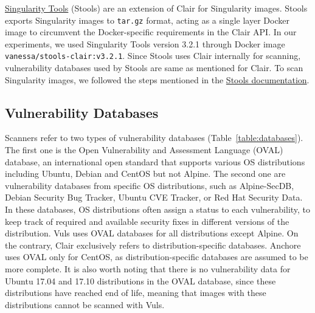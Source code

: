 \documentclass[a4paper,num-refs]{oup-contemporary}
\newcommand{\change}[2]{\color{cyan}Changes: #1\color{black}}
\newcommand{\tristan}[1]{\color{red}From Tristan: #1\color{black}}
\begin{document}
\href{https://github.com/singularityhub/stools}{Singularity Tools} (Stools)
are an extension of Clair for Singularity images. Stools
exports Singularity images to \texttt{tar.gz} format, acting as a single layer Docker image
to circumvent the Docker-specific requirements in the Clair API.
In our experiments, we used Singularity Tools version 3.2.1 through Docker
image
\texttt{vanessa/stools-clair:v3.2.1}.
Since Stools uses Clair internally for scanning, vulnerability databases used
by Stools are same as mentioned for Clair.
To scan Singularity images, we followed the steps mentioned in the
\href{https://github.com/singularityhub/stools}{Stools documentation}.

\subsection{Vulnerability Databases}

Scanners refer to two types of
vulnerability databases (Table~\ref{table:databases}). The first one is the Open Vulnerability and
Assessment Language (OVAL) database, an international open standard that
supports various OS distributions including Ubuntu, Debian and CentOS but
not Alpine. The second one are vulnerability databases from specific OS
distributions, such as Alpine-SecDB, Debian Security Bug Tracker, Ubuntu
CVE Tracker, or Red Hat Security Data. In these databases, OS distributions often assign a
status to each vulnerability, to keep track of required and available
security fixes in different versions of the distribution. Vuls uses OVAL
databases for all distributions except Alpine. On the contrary, Clair exclusively refers to
distribution-specific databases. Anchore uses OVAL only for CentOS, as distribution-specific databases
are assumed to be more complete.
It is also worth noting that there is no vulnerability data
for Ubuntu 17.04 and 17.10 distributions in the OVAL database, since these
distributions have reached end of life, meaning that images with these
distributions cannot be scanned with Vuls.
\end{document}
